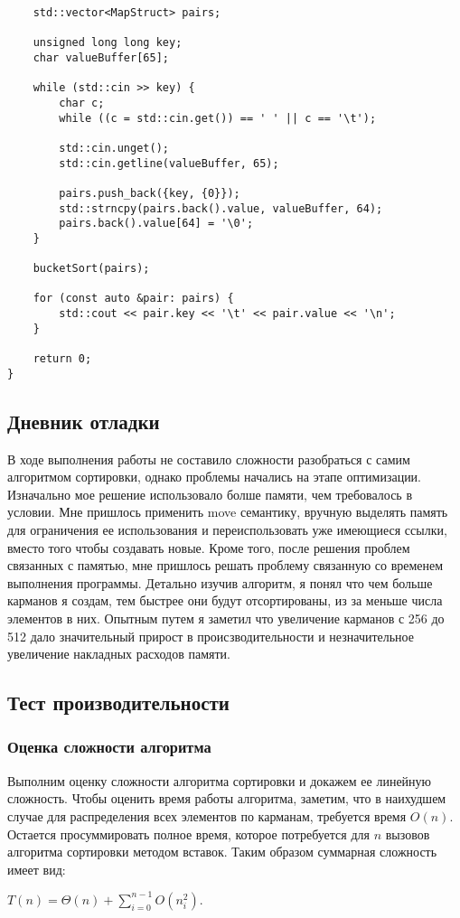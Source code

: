 \documentclass[12pt]{article}
\begin{document}
\begin{verbatim}
    std::vector<MapStruct> pairs;

    unsigned long long key;
    char valueBuffer[65];

    while (std::cin >> key) {
        char c;
        while ((c = std::cin.get()) == ' ' || c == '\t');

        std::cin.unget();
        std::cin.getline(valueBuffer, 65);

        pairs.push_back({key, {0}});
        std::strncpy(pairs.back().value, valueBuffer, 64);
        pairs.back().value[64] = '\0';
    }

    bucketSort(pairs);

    for (const auto &pair: pairs) {
        std::cout << pair.key << '\t' << pair.value << '\n';
    }

    return 0;
}

\end{verbatim}

\newpage
\subsection*{Дневник отладки}

В ходе выполнения работы не составило сложности разобраться с самим алгоритмом сортировки, однако проблемы начались на этапе оптимизации. Изначально мое решение использовало болше памяти, чем требовалось в условии. Мне пришлось применить move семантику, вручную выделять память для ограничения ее использования и переиспользовать уже имеющиеся ссылки, вместо того чтобы создавать новые. Кроме того, после решения проблем связанных с памятью, мне пришлось решать проблему связанную со временем выполнения программы. Детально изучив алгоритм, я понял что чем больше карманов я создам, тем быстрее они будут отсортированы, из за меньше числа элементов в них. Опытным путем я заметил что увеличение карманов с 256 до 512 дало значительный прирост в происзводительности и незначительное увеличение накладных расходов памяти.

\newpage
\subsection*{Тест производительности}

\subsubsection*{Оценка сложности алгоритма}
Выполним оценку сложности алгоритма сортировки и докажем ее линейную сложность. Чтобы оценить время работы алгоритма, заметим, что в наихудшем случае для распределения всех элементов по карманам, требуется время $O(n)$. Остается просуммировать полное время, которое потребуется для $n$ вызовов алгоритма сортировки методом вставок. Таким образом суммарная сложность имеет вид:
\begin{center}
   $T(n) = \Theta(n) + \sum_{i=0}^{n-1} O\left(n_i^2\right).$ 
\end{center}
\end{document}
